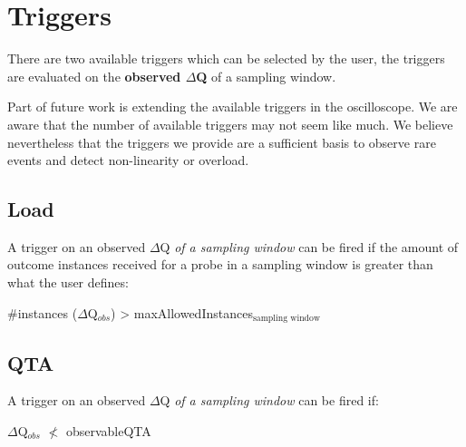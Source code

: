 \section{Triggers}
    There are two available triggers which can be selected by the user, the triggers are evaluated on the \textbf{observed $\Delta$Q} of a sampling window.

    Part of future work is extending the available triggers in the oscilloscope. We are aware that the number of available triggers may not seem like much. We believe nevertheless that the triggers we provide are a sufficient basis to observe rare events and detect non-linearity or overload. 
    \subsection{Load}
        A trigger on an observed $\Delta$Q \textit{of a sampling window} can be fired if the amount of outcome instances received for a probe in a sampling window is greater than what the user defines:
    \begin{center}
        \#instances ($\Delta$Q$_{obs}$) > maxAllowedInstances$_{\text{sampling window}}$ 
    \end{center}

    \subsection{QTA}
        A trigger on an observed $\Delta$Q \textit{of a sampling window} can be fired if:
        \begin{center}
            $\Delta$Q$_{obs}$ $\nless$ observableQTA
        \end{center}
